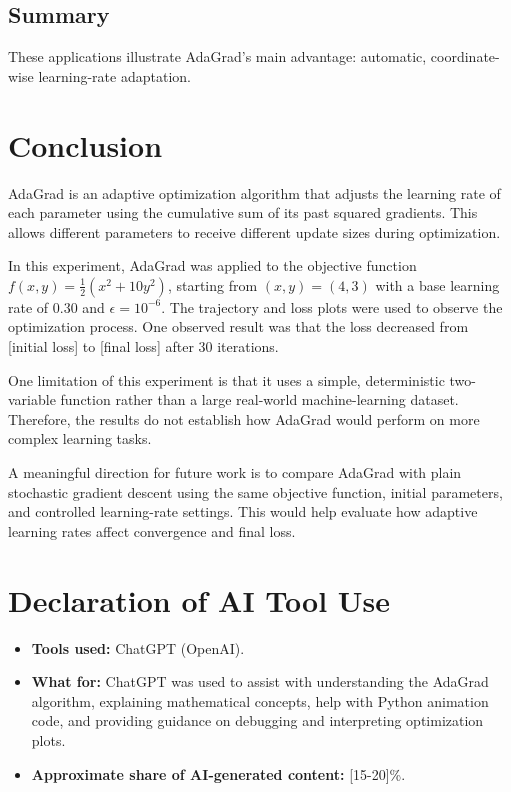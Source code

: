 \documentclass[11pt,a4paper]{article}
\begin{document}
\subsection{Summary}
These applications illustrate AdaGrad's main advantage: automatic,
coordinate-wise learning-rate adaptation. 

\section{Conclusion}

AdaGrad is an adaptive optimization algorithm that adjusts the
learning rate of each parameter using the cumulative sum of its
past squared gradients. This allows different parameters to receive
different update sizes during optimization.

In this experiment, AdaGrad was applied to the objective function
$f(x,y)=\frac{1}{2}(x^2+10y^2)$, starting from $(x,y)=(4,3)$
with a base learning rate of $0.30$ and $\epsilon=10^{-6}$.
The trajectory and loss plots were used to observe the optimization
process. One observed result was that the loss decreased from
[initial loss] to [final loss] after 30 iterations.

One limitation of this experiment is that it uses a simple,
deterministic two-variable function rather than a large real-world
machine-learning dataset. Therefore, the results do not establish
how AdaGrad would perform on more complex learning tasks.

A meaningful direction for future work is to compare AdaGrad with
plain stochastic gradient descent using the same objective function,
initial parameters, and controlled learning-rate settings. This
would help evaluate how adaptive learning rates affect convergence
and final loss.

\section*{Declaration of AI Tool Use}

\begin{itemize}
    \item \textbf{Tools used:} ChatGPT (OpenAI).

    \item \textbf{What for:} ChatGPT was used to assist with
    understanding the AdaGrad algorithm, explaining mathematical            concepts, help with Python animation code, and providing                       guidance on debugging and interpreting optimization plots.

    \item \textbf{Approximate share of AI-generated content:}
    [15-20]\%.
\end{itemize}
\end{document}
